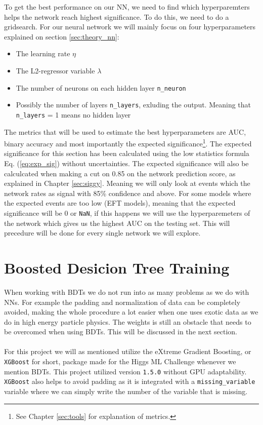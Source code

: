 \documentclass[12pt, a4paper]{book}
\begin{document}
To get the best performance on our NN, we need to find which hyperparemters helps the network reach highest significance. To do this, we need to do a gridsearch. 
For our neural network we will mainly focus on four hyperparameters explained on section \ref{sec:theory_nn}:
\begin{itemize}
   \item The learning rate $\eta$
   \item The L2-regressor variable $\lambda$
   \item The number of neurons on each hidden layer \verb|n_neuron|
   \item Possibly the number of layers \verb|n_layers|, exluding the output. Meaning that \verb|n_layers| = 1 means no hidden layer
\end{itemize}
The metrics that will be used to estimate the best hyperparameters are AUC, binary accuracy and most importantly the expected significance\footnote{See Chapter \ref{sec:tools} for explanation of metrics.}.
The expected significance for this section has been calculated using the low statistics formula Eq. (\ref{eq:exp_sig}) without uncertainties. The expected significance will also be calculcated when making a cut on 0.85 on the network prediction score, as explained in Chapter \ref{sec:siggy}. 
Meaning we will only look at events which the network rates as signal with 85\% confidence and above. For some models where the expected events are too low (EFT models), meaning that the expected significance will be 0 or \verb|NaN|, if this happens we will use the hyperparemeters of the network 
which gives us the highest AUC on the testing set. This will precedure will be done for every single network we will explore.
\clearpage


\section{Boosted Desicion Tree Training}
When working with BDTs we do not run into as many problems as we do with NNs. For example the padding and normalization of data can be completely avoided, making the whole procedure a lot easier when one uses exotic data as we do in high energy particle physics.
The weights is still an obstacle that needs to be overcomed when using BDTs. This will be discussed in the next section.\\
\\For this project we will as mentioned utilize the eXtreme Gradient Boosting, or \verb|XGBoost| for short, package \cite{XGBoost} made for the Higgs ML Challenge \cite{HiggsChallenge} whenever we mention BDTs.
This project utilized version \verb|1.5.0| without GPU adaptability. \verb|XGBoost| also helps to avoid padding as it is integrated with a \verb|missing_variable| variable where we can simply write the number of the variable that is missing.
\end{document}
